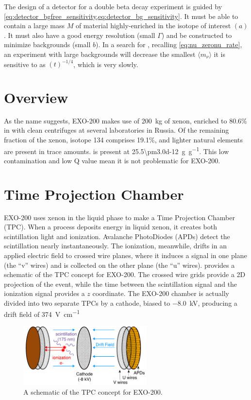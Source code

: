 \documentclass[herrin-thesis.tex]{subfiles}
\begin{document}
The design of a detector for a double beta decay experiment is guided by \cref{eq:detector_bgfree_sensitivity,eq:detector_bg_sensitivity}. It must be able to contain a large mass \(M\) of material highly-enriched in the isotope of interest \((a)\). It must also have a good energy resolution (small \(\Gamma\)) and be constructed to minimize backgrounds (small \(b\)). In a search for \zeronu{}, recalling \cref{eq:nu_zeronu_rate}, an experiment with large backgrounds will decrease the smallest  \(\langle m_{\nu} \rangle\) it is sensitive to as \((t)^{-1/4}\), which is very slowly.

\section{Overview}



As the name suggests, EXO-200 makes use of \SI{200}{\kg} of xenon, enriched to 80.6\% in  with clean centrifuges at several laboratories in Russia. Of the remaining fraction of the xenon, isotope 134 comprises 19.1\%, and lighter natural elements are present in trace amounts.  is present at \SI[per-mode=symbol]{25.5\pm3.0d-12}{\g\per\g}\cite{Dobi:2012nx}. This low contamination and low Q value mean it is not problematic for EXO-200.

\section{Time Projection Chamber}
EXO-200 uses xenon in the liquid phase to make a Time Projection Chamber (TPC). When a process deposits energy in liquid xenon, it creates both scintillation light and ionization. Avalanche PhotoDiodes (APDs) detect the scintillation nearly instantaneously. The ionization, meanwhile, drifts in an applied electric field to crossed wire planes, where it induces a signal in one plane (the ``v'' wires) and is collected on the other plane (the ``u'' wires).  provides a schematic of the TPC concept for EXO-200. The crossed wire grids provide a 2D projection of the event, while the time between the scintillation signal and the ionization signal provides a \(z\) coordinate. The EXO-200 chamber is actually divided into two separate TPCs by a cathode, biased to \SI{-8.0}{\kV}, producing a drift field of \SI{374}{\V\per\cm}

\begin{figure}
\centering
\includegraphics[width=0.6\textwidth]{./figures/tpc_schematic.pdf}
\caption[A schematic of a TPC]{A schematic of the TPC concept for EXO-200.}
\label{fig:detector_tpc_cartoon}
\end{figure}
\end{document}
